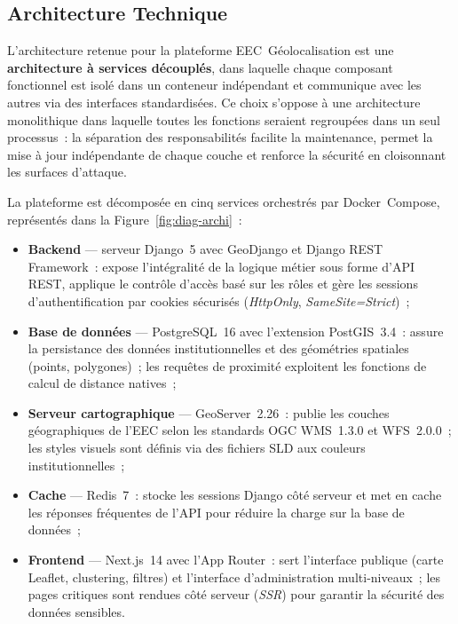 

\subsection{Architecture Technique}
\label{ssec:archi}

L'architecture retenue pour la plateforme EEC~Géolocalisation est une
\textbf{architecture à services découplés}, dans laquelle chaque composant
fonctionnel est isolé dans un conteneur indépendant et communique avec les
autres via des interfaces standardisées. Ce choix s'oppose à une architecture
monolithique dans laquelle toutes les fonctions seraient regroupées dans un
seul processus~: la séparation des responsabilités facilite la maintenance,
permet la mise à jour indépendante de chaque couche et renforce la sécurité en
cloisonnant les surfaces d'attaque.

La plateforme est décomposée en cinq services orchestrés par Docker~Compose,
représentés dans la Figure~\ref{fig:diag-archi}~:

\begin{itemize}[itemsep=3pt, topsep=5pt, leftmargin=1.5cm]
  \item \textbf{Backend} --- serveur Django~5 avec GeoDjango et
    Django REST Framework~: expose l'intégralité de la logique métier
    sous forme d'API REST, applique le contrôle d'accès basé sur les rôles
    et gère les sessions d'authentification par cookies sécurisés
    (\textit{HttpOnly}, \textit{SameSite=Strict})~;
  \item \textbf{Base de données} --- PostgreSQL~16 avec l'extension
    PostGIS~3.4~: assure la persistance des données institutionnelles et
    des géométries spatiales (points, polygones)~; les requêtes de
    proximité exploitent les fonctions de calcul de distance natives~;
  \item \textbf{Serveur cartographique} --- GeoServer~2.26~: publie les
    couches géographiques de l'EEC selon les standards OGC WMS~1.3.0 et
    WFS~2.0.0~; les styles visuels sont définis via des fichiers SLD aux
    couleurs institutionnelles~;
  \item \textbf{Cache} --- Redis~7~: stocke les sessions Django côté
    serveur et met en cache les réponses fréquentes de l'API pour réduire
    la charge sur la base de données~;
  \item \textbf{Frontend} --- Next.js~14 avec l'App Router~: sert
    l'interface publique (carte Leaflet, clustering, filtres) et
    l'interface d'administration multi-niveaux~; les pages critiques sont
    rendues côté serveur (\textit{SSR}) pour garantir la sécurité des
    données sensibles.
\end{itemize}

